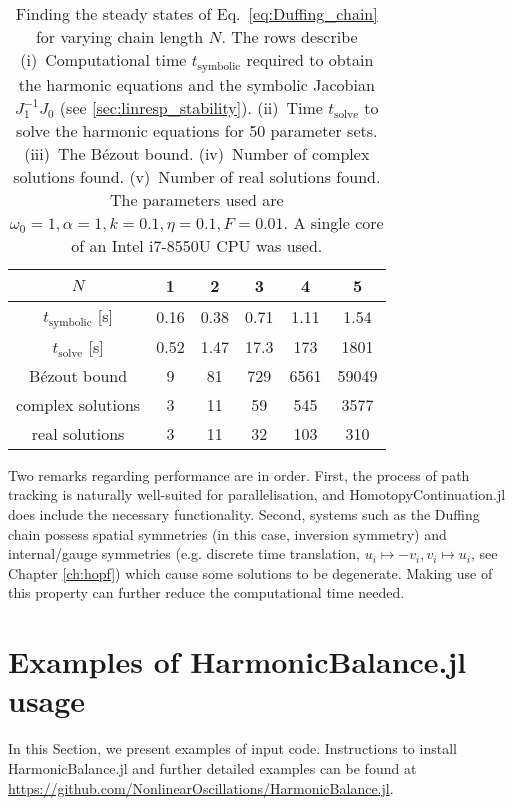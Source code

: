 	\begin{table}[ht!] 
	    \centering
	    \caption{Finding the steady states of Eq.~\eqref{eq:Duffing_chain} for varying chain length $N$. The rows describe (i)~Computational time $t_{\mathrm{symbolic}}$ required to obtain the harmonic equations and the symbolic Jacobian $J_1^{-1}J_0$ (see \ref{sec:linresp_stability}). (ii)~Time $t_{\mathrm{solve}}$ to solve the harmonic equations for 50 parameter sets. (iii)~The B\'{e}zout bound. (iv)~Number of complex solutions found. (v)~Number of real solutions found. The parameters used are $\omega_0 = 1, \alpha = 1, k=0.1, \eta = 0.1, F=0.01$. A single core of an Intel i7-8550U CPU was used.}
		\label{table:benchmark}
        \begin{tabular}{ |c|c|c|c|c|c|} 
         \hline
         $N$ & 1 & 2 & 3 & 4 & 5 \\ \hline
         $t_{\mathrm{symbolic}}$ [s] & 0.16 & 0.38 & 0.71 & 1.11 & 1.54 \\
         $t_{\mathrm{solve}}$ [s] & 0.52 & 1.47 & 17.3 & 173 & 1801 \\
         B\'{e}zout bound & 9 & 81 & 729 & 6561 & 59049 \\
         complex solutions & 3 & 11 & 59 & 545 & 3577\\
         real solutions & 3 & 11 & 32 & 103 & 310 \\
         \hline
        \end{tabular}

	\end{table}
    
    Two remarks regarding performance are in order. First, the process of path tracking is naturally well-suited for parallelisation, and HomotopyContinuation.jl does include the necessary functionality. Second, systems such as the Duffing chain possess spatial symmetries (in this case, inversion symmetry) and internal/gauge symmetries (e.g. discrete time translation, $u_i\mapsto -v_i, v_i\mapsto u_i$, see Chapter \ref{ch:hopf}) which cause some solutions to be degenerate. Making use of this property can further reduce the computational time needed.
    
\section{Examples of HarmonicBalance.jl usage} \label{sec:examples}
In this Section, we present examples of input code. Instructions to install HarmonicBalance.jl and further detailed examples can be found at \url{https://github.com/NonlinearOscillations/HarmonicBalance.jl}.

